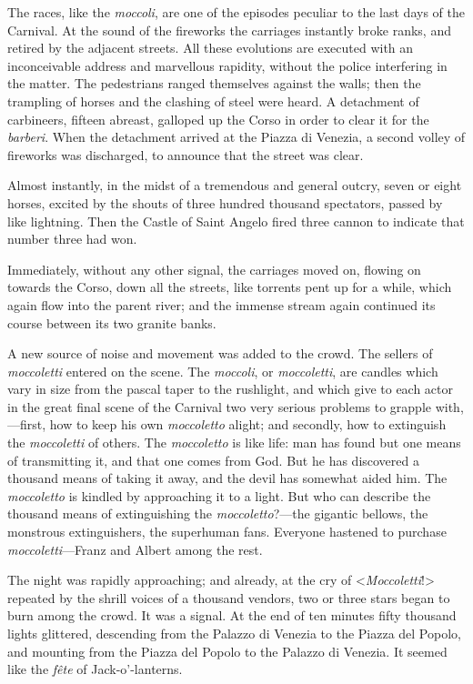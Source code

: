  The races, like the \textit{moccoli}, are one of the episodes peculiar to the last days of the Carnival. At the sound of the fireworks the carriages instantly broke ranks, and retired by the adjacent streets. All these evolutions are executed with an inconceivable address and marvellous rapidity, without the police interfering in the matter. The pedestrians ranged themselves against the walls; then the trampling of horses and the clashing of steel were heard. A detachment of carbineers, fifteen abreast, galloped up the Corso in order to clear it for the \textit{barberi}. When the detachment arrived at the Piazza di Venezia, a second volley of fireworks was discharged, to announce that the street was clear. 

 Almost instantly, in the midst of a tremendous and general outcry, seven or eight horses, excited by the shouts of three hundred thousand spectators, passed by like lightning. Then the Castle of Saint Angelo fired three cannon to indicate that number three had won. 

 Immediately, without any other signal, the carriages moved on, flowing on towards the Corso, down all the streets, like torrents pent up for a while, which again flow into the parent river; and the immense stream again continued its course between its two granite banks. 

 A new source of noise and movement was added to the crowd. The sellers of \textit{moccoletti} entered on the scene. The \textit{moccoli}, or \textit{moccoletti}, are candles which vary in size from the pascal taper to the rushlight, and which give to each actor in the great final scene of the Carnival two very serious problems to grapple with,—first, how to keep his own \textit{moccoletto} alight; and secondly, how to extinguish the \textit{moccoletti} of others. The \textit{moccoletto} is like life: man has found but one means of transmitting it, and that one comes from God. But he has discovered a thousand means of taking it away, and the devil has somewhat aided him. The \textit{moccoletto} is kindled by approaching it to a light. But who can describe the thousand means of extinguishing the \textit{moccoletto}?—the gigantic bellows, the monstrous extinguishers, the superhuman fans. Everyone hastened to purchase \textit{moccoletti}—Franz and Albert among the rest. 

 The night was rapidly approaching; and already, at the cry of <\textit{Moccoletti}!> repeated by the shrill voices of a thousand vendors, two or three stars began to burn among the crowd. It was a signal. At the end of ten minutes fifty thousand lights glittered, descending from the Palazzo di Venezia to the Piazza del Popolo, and mounting from the Piazza del Popolo to the Palazzo di Venezia. It seemed like the \textit{fête} of Jack-o'-lanterns. 

